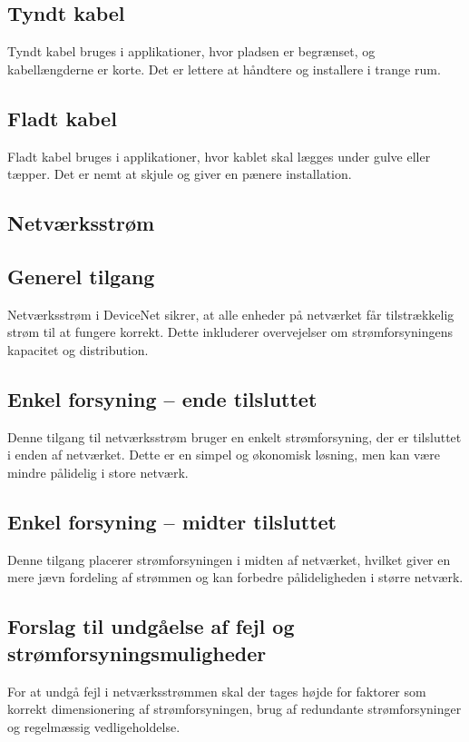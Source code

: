 \subsection*{Tyndt kabel}
Tyndt kabel bruges i applikationer, hvor pladsen er begrænset, og kabellængderne er korte. Det er lettere at håndtere og installere i trange rum.

\subsection*{Fladt kabel}
Fladt kabel bruges i applikationer, hvor kablet skal lægges under gulve eller tæpper. Det er nemt at skjule og giver en pænere installation.

\subsection{Netværksstrøm}
\subsection*{Generel tilgang}
Netværksstrøm i DeviceNet sikrer, at alle enheder på netværket får tilstrækkelig strøm til at fungere korrekt. Dette inkluderer overvejelser om strømforsyningens kapacitet og distribution.

\subsection*{Enkel forsyning – ende tilsluttet}
Denne tilgang til netværksstrøm bruger en enkelt strømforsyning, der er tilsluttet i enden af netværket. Dette er en simpel og økonomisk løsning, men kan være mindre pålidelig i store netværk.

\subsection*{Enkel forsyning – midter tilsluttet}
Denne tilgang placerer strømforsyningen i midten af netværket, hvilket giver en mere jævn fordeling af strømmen og kan forbedre pålideligheden i større netværk.

\subsection*{Forslag til undgåelse af fejl og strømforsyningsmuligheder}
For at undgå fejl i netværksstrømmen skal der tages højde for faktorer som korrekt dimensionering af strømforsyningen, brug af redundante strømforsyninger og regelmæssig vedligeholdelse.

